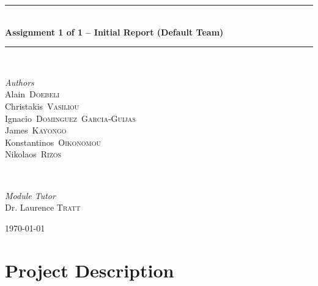 \documentclass[11pt]{article}
\begin{document}
\begin{titlepage}
	\rule{\linewidth}{0.5mm} \\[4mm]
	{\Large \bfseries Assignment 1 of 1 -- Initial Report (Default Team)} \\
	\rule{\linewidth}{0.5mm} \\[8mm]
	\begin{minipage}[t]{0.5\textwidth}
		\begin{flushleft}
			\large
			\textit{Authors} \\
			\mbox{Alain \textsc{Doebeli}} \\ %
			\mbox{Christakis \textsc{Vasiliou}} \\ %
			\mbox{Ignacio \textsc{Dominguez Garcia-Guijas}} \\ %
			\mbox{James \textsc{Kayongo}} \\ %
			\mbox{Konstantinos \textsc{Oikonomou}} \\ %
			\mbox{Nikolaos \textsc{Rizos}} \\ %
		\end{flushleft}
	\end{minipage}
	~
	\begin{minipage}[t]{0.4\textwidth}
		\begin{flushright}
			\large
			\textit{Module Tutor} \\
			Dr. Laurence \textsc{Tratt}
		\end{flushright}
	\end{minipage}
	
	\vspace*{\fill}
	\hspace{0pt}
	
	{\large{\today}} %
	
	\vspace*{\fill}
	\hspace{0pt}
	
\end{titlepage}


\section{Project Description}
\end{document}
